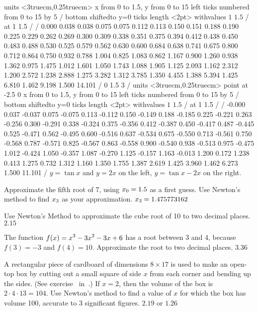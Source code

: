 \figure
\texonly
\vbox{\beginpicture
\normalgraphs
\sevenpoint
\setcoordinatesystem units <3truecm,0.25truecm>
\setplotarea x from 0 to 1.5, y from 0 to 15
\axis left ticks numbered from 0 to 15 by 5 /
\axis bottom shiftedto y=0 ticks length <2pt> withvalues {$1$} {$1.5$} / at
1 1.5 / /
 0.000 0.038 0.038 0.075 0.075 0.112 0.113 0.150 0.151 
0.188 0.190 0.225 0.229 0.262 0.269 0.300 0.309 0.338 0.351 
0.375 0.394 0.412 0.438 0.450 0.483 0.488 0.530 0.525 0.579 
0.562 0.630 0.600 0.684 0.638 0.741 0.675 0.800 0.712 0.864 
0.750 0.932 0.788 1.004 0.825 1.083 0.862 1.167 0.900 1.260 
0.938 1.362 0.975 1.475 1.012 1.601 1.050 1.743 1.088 1.905 
1.125 2.093 1.162 2.312 1.200 2.572 1.238 2.888 1.275 3.282 
1.312 3.785 1.350 4.455 1.388 5.394 1.425 6.810 1.462 9.198 
1.500 14.101  /
\setlinear
{} 0 1.5 3 /
\setcoordinatesystem units <3truecm,0.25truecm> point at -2.5 0
\setplotarea x from 0 to 1.5, y from 0 to 15
\axis left ticks numbered from 0 to 15 by 5 /
\axis bottom shiftedto y=0 ticks length <2pt> withvalues {$1$} {$1.5$} / at
1 1.5 / /
 -0.000 0.037 -0.037 0.075 -0.075 0.113 -0.112 0.150 -0.149
0.188 -0.185 0.225 -0.221 0.263 -0.256 0.300 -0.291 0.338 -0.324
0.375 -0.356 0.412 -0.387 0.450 -0.417 0.487 -0.445 0.525 -0.471
0.562 -0.495 0.600 -0.516 0.637 -0.534 0.675 -0.550 0.713 -0.561
0.750 -0.568 0.787 -0.571 0.825 -0.567 0.863 -0.558 0.900 -0.540
0.938 -0.513 0.975 -0.475 1.012 -0.424 1.050 -0.357 1.087 -0.270
1.125 -0.157 1.163 -0.013 1.200 0.172 1.238 0.413 1.275 0.732
1.312 1.160 1.350 1.755 1.387 2.619 1.425 3.960 1.462 6.273
1.500 11.101 /
\endpicture}
\endtexonly
{}
\begincaption
$y=\tan x$ and $y=2x$ on the left, $y=\tan x-2x$ on the right.
\endcaption
\endfigure

\exercises

\exercise Approximate the fifth root of 7, using $\displaystyle x_0=1.5$ as a
first guess. Use Newton's method to find $\displaystyle x_3$ as your
approximation.  
\answer $\displaystyle x_3=1.475773162$ 
\endanswer
\endexercise

\exercise Use Newton's Method to approximate the cube root of 10 to
two decimal places.
\answer $2.15$
\endanswer
\endexercise

\exercise The function 
$\displaystyle f(x)=x^3-3x^2-3x+6$ has a root between 3 and 4, because
$f(3)=-3$ and $f(4)=10$. Approximate the root to two decimal places.
\answer  $3.36$
\endanswer
\endexercise

\exercise A rectangular piece of cardboard of dimensions $8\times 17$
is used to make an open-top box by cutting out a small square of side
$x$ from each corner and bending up the sides.  (See
exercise~ in~.)
If $x=2$, then the volume of the box is $2\cdot 4\cdot 13=104$.  Use
Newton's method to find a value of $x$ for which the box has volume
100, accurate to 3 significant figures.  
\answer $2.19$ or $1.26$
\endanswer

